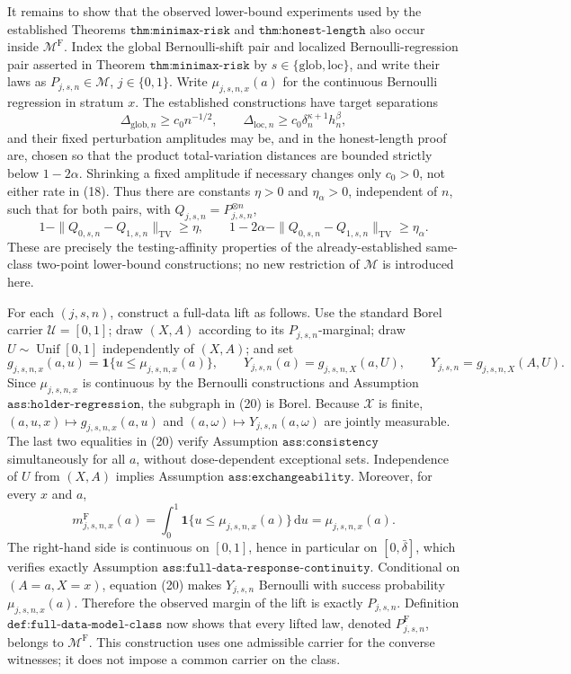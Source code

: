 It remains to show that the observed lower-bound experiments used by the established Theorems \(\texttt{thm:minimax-risk}\) and \(\texttt{thm:honest-length}\) also occur inside \(\mathcal M^{\mathrm F}\).  Index the global Bernoulli-shift pair and localized Bernoulli-regression pair asserted in Theorem \(\texttt{thm:minimax-risk}\) by \(s\in\{\mathrm{glob},\mathrm{loc}\}\), and write their laws as \(P_{j,s,n}\in\mathcal M\), \(j\in\{0,1\}\).  Write \(\mu_{j,s,n,x}(a)\) for the continuous Bernoulli regression in stratum \(x\).  The established constructions have target separations
\[
 \Delta_{\mathrm{glob},n}\geq c_0n^{-1/2},
 \qquad
 \Delta_{\mathrm{loc},n}\geq c_0\delta_n^{\kappa+1}h_n^\beta,
 \tag{18}
\]
and their fixed perturbation amplitudes may be, and in the honest-length proof are, chosen so that the product total-variation distances are bounded strictly below \(1-2\alpha\).  Shrinking a fixed amplitude if necessary changes only \(c_0>0\), not either rate in (18).  Thus there are constants \(\eta>0\) and \(\eta_\alpha>0\), independent of \(n\), such that for both pairs, with \(Q_{j,s,n}=P_{j,s,n}^{\otimes n}\),
\[
 1-\|Q_{0,s,n}-Q_{1,s,n}\|_{\mathrm{TV}}\geq\eta,
 \qquad
 1-2\alpha-\|Q_{0,s,n}-Q_{1,s,n}\|_{\mathrm{TV}}\geq\eta_\alpha.
 \tag{19}
\]
These are precisely the testing-affinity properties of the already-established same-class two-point lower-bound constructions; no new restriction of \(\mathcal M\) is introduced here.

For each \((j,s,n)\), construct a full-data lift as follows.  Use the standard Borel carrier \(\mathcal U=[0,1]\); draw \((X,A)\) according to its \(P_{j,s,n}\)-marginal; draw \(U\sim\operatorname{Unif}[0,1]\) independently of \((X,A)\); and set
\[
 g_{j,s,n,x}(a,u)=\mathbf 1\{u\leq\mu_{j,s,n,x}(a)\},
 \qquad
 Y_{j,s,n}(a)=g_{j,s,n,X}(a,U),
 \qquad
 Y_{j,s,n}=g_{j,s,n,X}(A,U).
 \tag{20}
\]
Since \(\mu_{j,s,n,x}\) is continuous by the Bernoulli constructions and Assumption \(\texttt{ass:holder-regression}\), the subgraph in (20) is Borel.  Because \(\mathcal X\) is finite, \((a,u,x)\mapsto g_{j,s,n,x}(a,u)\) and \((a,\omega)\mapsto Y_{j,s,n}(a,\omega)\) are jointly measurable.  The last two equalities in (20) verify Assumption \(\texttt{ass:consistency}\) simultaneously for all \(a\), without dose-dependent exceptional sets.  Independence of \(U\) from \((X,A)\) implies Assumption \(\texttt{ass:exchangeability}\).  Moreover, for every \(x\) and \(a\),
\[
 m_{j,s,n,x}^{\mathrm F}(a)
 =\int_0^1\mathbf 1\{u\leq\mu_{j,s,n,x}(a)\}\,\mathrm du
 =\mu_{j,s,n,x}(a).
 \tag{21}
\]
The right-hand side is continuous on \([0,1]\), hence in particular on \([0,\bar\delta]\), which verifies exactly Assumption \(\texttt{ass:full-data-response-continuity}\).  Conditional on \((A=a,X=x)\), equation (20) makes \(Y_{j,s,n}\) Bernoulli with success probability \(\mu_{j,s,n,x}(a)\).  Therefore the observed margin of the lift is exactly \(P_{j,s,n}\).  Definition \(\texttt{def:full-data-model-class}\) now shows that every lifted law, denoted \(P^{\mathrm F}_{j,s,n}\), belongs to \(\mathcal M^{\mathrm F}\).  This construction uses one admissible carrier for the converse witnesses; it does not impose a common carrier on the class.


